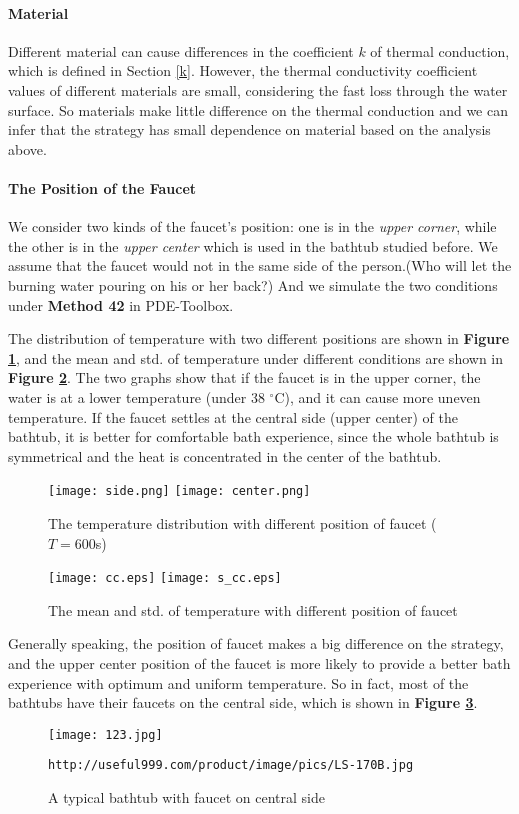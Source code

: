 \documentclass{HZNUMCM}
\begin{document}
\paragraph{Material}Different material can cause differences in the coefficient $k$ of thermal
conduction, which is defined in Section \ref{k}. However, the thermal conductivity coefficient
values of different materials are small, considering the fast loss through the water surface. So
materials make little difference on the thermal conduction and we can infer that the strategy has
small dependence on material based on the analysis above.

\paragraph{The Position of the Faucet}We consider two kinds of the faucet's position: one is in the
\emph{upper corner}, while the other is in the \emph{upper center} which is used in the bathtub
studied before. We assume that the faucet would not in the same side of the person.(Who will let the
burning water pouring on his or her back?) And we simulate the two conditions under \textbf{Method
42} in PDE-Toolbox.

The distribution of temperature with two different positions are shown in \textbf{Figure
\ref{center}}, and the mean and std. of temperature under different conditions are shown in
\textbf{Figure \ref{mc}}. The two graphs show that if the faucet is in the upper corner, the water
is at a lower temperature (under 38 $^\circ$C), and it can cause more uneven temperature. If the
faucet settles at the central side (upper center) of the bathtub, it is better for comfortable bath
experience, since the whole bathtub is symmetrical and the heat is concentrated in the center of the
bathtub.
\begin{figure}[!htbp]
\small
\centering
\texttt{[image: side.png]}
\texttt{[image: center.png]}
\caption{The temperature distribution with different position of faucet ($T=600$s)}\label{center}
\end{figure}

\begin{figure}[!htbp]
\small
\centering
\texttt{[image: cc.eps]}
\texttt{[image: s\_cc.eps]}
\caption{The mean and std. of temperature with different position of faucet}\label{mc}
\end{figure}

Generally speaking, the position of faucet makes a big difference on the strategy, and the upper
center position of the faucet is more likely to provide a better bath experience with optimum and
uniform temperature. So in fact, most of the bathtubs have their faucets on the central side, which
is shown in \textbf{Figure \ref{fact}}.
\begin{figure}[!htbp]
\small
\centering
\texttt{[image: 123.jpg]}
\caption{A typical bathtub with faucet on central side}\label{fact}
\texttt{http://useful999.com/product/image/pics/LS-170B.jpg}
\end{figure}
\end{document}
